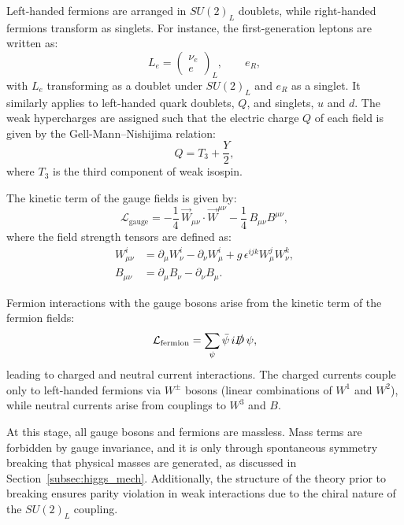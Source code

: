 Left-handed fermions are arranged in $SU(2)_L$ doublets, while right-handed fermions transform as singlets. For instance, the first-generation leptons are written as:
\begin{equation}
L_e =
\begin{pmatrix}
\nu_e \\
e
\end{pmatrix}_L, \qquad e_R,
\end{equation}
with $L_e$ transforming as a doublet under $SU(2)_L$ and $e_R$ as a singlet. It similarly applies to left-handed quark doublets, $Q$, and singlets, $u$ and $d$. The weak hypercharges are assigned such that the electric charge $Q$ of each field is given by the Gell-Mann–Nishijima relation:
\begin{equation}
Q = T_3 + \frac{Y}{2},
\end{equation}
where $T_3$ is the third component of weak isospin.

The kinetic term of the gauge fields is given by:
\begin{equation}
\mathcal{L}_{\text{gauge}} = -\frac{1}{4} \, \vec{W}_{\mu\nu} \cdot \vec{W}^{\mu\nu} - \frac{1}{4} \, B_{\mu\nu} B^{\mu\nu},
\end{equation}
where the field strength tensors are defined as:
\begin{align}
W_{\mu\nu}^i &= \partial_\mu W_\nu^i - \partial_\nu W_\mu^i + g \, \epsilon^{ijk} W_\mu^j W_\nu^k, \\
B_{\mu\nu} &= \partial_\mu B_\nu - \partial_\nu B_\mu.
\end{align}

Fermion interactions with the gauge bosons arise from the kinetic term of the fermion fields:
\begin{equation}
\mathcal{L}_{\text{fermion}} = \sum_{\psi} \bar{\psi} \, i \slashed{D} \, \psi,
\end{equation}
leading to charged and neutral current interactions. The charged currents couple only to left-handed fermions via $W^\pm$ bosons (linear combinations of $W^1$ and $W^2$), while neutral currents arise from couplings to $W^3$ and $B$.

At this stage, all gauge bosons and fermions are massless. Mass terms are forbidden by gauge invariance, and it is only through spontaneous symmetry breaking that physical masses are generated, as discussed in Section~\ref{subsec:higgs_mech}. Additionally, the structure of the theory prior to breaking ensures parity violation in weak interactions due to the chiral nature of the $SU(2)_L$ coupling.

